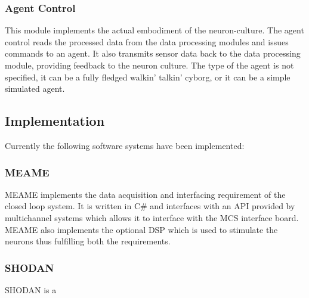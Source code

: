 \subsubsection{Agent Control}
This module implements the actual embodiment of the neuron-culture. The agent
control reads the processed data from the data processing modules and issues
commands to an agent. It also transmits sensor data back to the data processing
module, providing feedback to the neuron culture.
The type of the agent is not specified, it can be a fully fledged walkin'
talkin' cyborg, or it can be a simple simulated agent.
\subsection{Implementation} 
Currently the following software systems have been implemented:
\subsubsection{MEAME}
MEAME implements the data acquisition and interfacing requirement of the closed
loop system. It is written in C# and interfaces with an API provided by
multichannel systems which allows it to interface with the MCS interface board.
MEAME also implements the optional DSP which is used to stimulate the neurons
thus fulfilling both the requirements.
\subsubsection{SHODAN}
SHODAN is a 
% 
% 
% 
